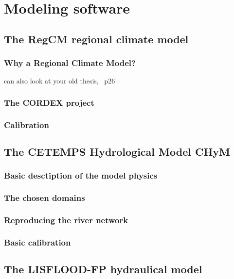 \chapter{Modeling software} \label{chp:models}

\section{The RegCM regional climate model}
\subsection{Why a Regional Climate Model?}
can also look at your old thesis, ~p26
\subsection{The CORDEX project}
\subsection{Calibration}

\section{The CETEMPS Hydrological Model CHyM}
\subsection{Basic desctiption of the model physics}
\subsection{The chosen domains}
\subsection{Reproducing the river network}
\subsection{Basic calibration}


\section{The LISFLOOD-FP hydraulical model}
